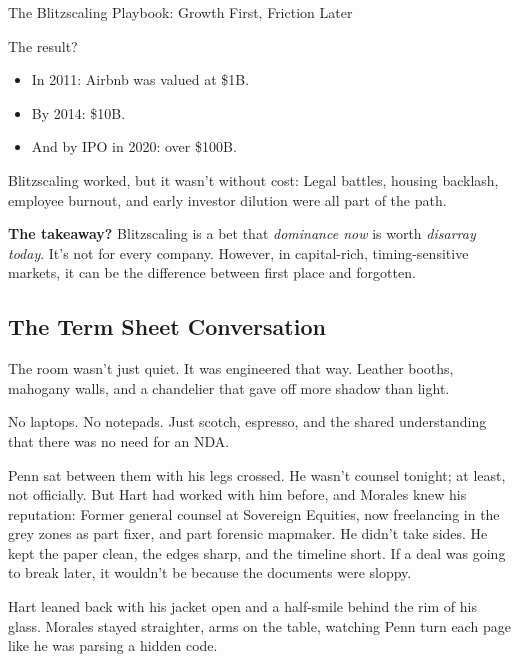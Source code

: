 \begin{HistoricalSidebar}{The Blitzscaling Playbook: Growth First, Friction Later}
  \medskip
  
  The result?

  \medskip
  
  \begin{itemize}
    \item In 2011: Airbnb was valued at \$1B.
    \item By 2014: \$10B.
    \item And by IPO in 2020: over \$100B.
  \end{itemize}
  
  \medskip
  
  Blitzscaling worked, but it wasn't without cost:  
  Legal battles, housing backlash, employee burnout, and early investor dilution were all part of the path.
  
  \medskip
  
  \textbf{The takeaway?}  
  Blitzscaling is a bet that \textit{dominance now} is worth \textit{disarray today}.  
  It’s not for every company. However, in capital-rich, timing-sensitive markets, it can be the difference between first place 
  and forgotten.
  
\end{HistoricalSidebar}



\subsection{The Term Sheet Conversation}

The room wasn’t just quiet. It was engineered that way.
Leather booths, mahogany walls, and a chandelier that gave off more shadow than light.

No laptops. No notepads. Just scotch, espresso, and the shared understanding that there was 
no need for an NDA.

Penn sat between them with his legs crossed.
He wasn’t counsel tonight; at least, not officially.
But Hart had worked with him before, and Morales knew his reputation:
Former general counsel at Sovereign Equities, now freelancing in the grey zones as part fixer, and part 
forensic mapmaker.
He didn’t take sides. He kept the paper clean, the edges sharp, and the timeline short.
If a deal was going to break later, it wouldn’t be because the documents were sloppy.

Hart leaned back with his jacket open and a half-smile behind the rim of his glass.
Morales stayed straighter, arms on the table, watching Penn turn each page like he was parsing a hidden code.

